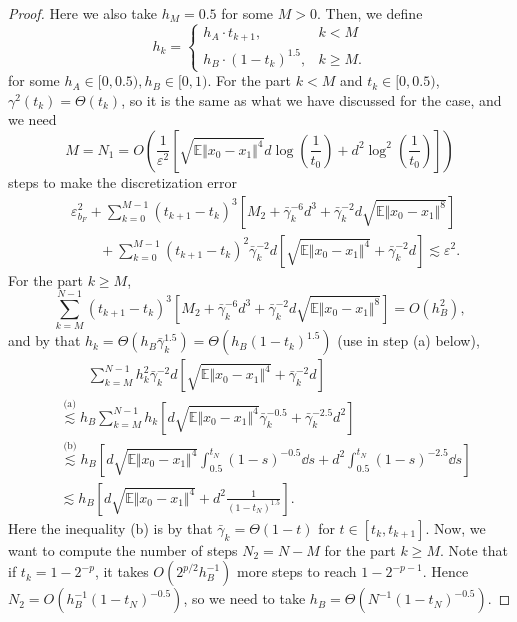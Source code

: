 \begin{proof}
    Here we also take $h_M=0.5$ for some $M>0$. Then, we define
    $$h_k=\begin{cases}
        h_A\cdot t_{k+1},&k<M\\
        h_B\cdot (1-t_k)^{1.5},&k\ge M.
    \end{cases}$$
    for some $h_A\in[0,0.5),h_B\in[0,1)$.
    For the part $k<M$ and $t_k\in[0,0.5)$, $\gamma^2(t_k)=\Theta(t_k)$, so it is the same as what we have discussed for the case, and we need $$M=N_1=O\left(\frac{1}{\varepsilon^2}\left[\sqrt{\mathbb{E}\Vert x_0-x_1\Vert^4}d\log\left(\frac{1}{t_0}\right)+d^2\log^2\left(\frac{1}{t_0}\right)\right]\right)$$
    steps to make the discretization error $$\begin{aligned}
        &\varepsilon_{b_F}^2+\sum_{k=0}^{M-1}(t_{k+1}-t_k)^3\left[M_2+\bar{\gamma}_k^{-6}d^3+\bar{\gamma}_k^{-2}d\sqrt{\mathbb{E}\Vert x_0-x_1\Vert^{8}}\right]\\
        &\qquad+\sum_{k=0}^{M-1}(t_{k+1}-t_k)^2\bar{\gamma}_k^{-2}d\left[\sqrt{\mathbb{E}\Vert x_0-x_1\Vert^4}+\bar{\gamma}_k^{-2}d\right]\lesssim\varepsilon^2.
    \end{aligned}$$
    For the part $k\ge M$, 
    $$\sum_{k=M}^{N-1}(t_{k+1}-t_k)^3\left[M_2+\bar{\gamma}_k^{-6}d^3+\bar{\gamma}_k^{-2}d\sqrt{\mathbb{E}\Vert x_0-x_1\Vert^{8}}\right]=O(h_B^2),$$
    and by that $h_k=\Theta(h_B\bar{\gamma}_k^{1.5})=\Theta(h_B(1-t_k)^{1.5})$ (use in step (a) below),
    $$\begin{aligned}
        &\qquad\sum_{k=M}^{N-1}h_k^2\bar{\gamma}_k^{-2}d\left[\sqrt{\mathbb{E}\Vert x_0-x_1\Vert^4}+\bar{\gamma}_k^{-2}d\right]\\
        &\overset{\text{(a)}}{\lesssim} h_B\sum_{k=M}^{N-1}h_k\left[d\sqrt{\mathbb{E}\Vert x_0-x_1\Vert^4}\bar{\gamma}_k^{-0.5}+\bar{\gamma}_k^{-2.5}d^2\right]\\
        &\overset{\text{(b)}}{\lesssim} h_B\left[d\sqrt{\mathbb{E}\Vert x_0-x_1\Vert^4}\int_{0.5}^{t_N}(1-s)^{-0.5}\dd s+d^2\int_{0.5}^{t_N}(1-s)^{-2.5}\dd s\right]\\
        &\lesssim h_B\left[d\sqrt{\mathbb{E}\Vert x_0-x_1\Vert^4}+d^2\frac{1}{(1-t_N)^{1.5}}\right].
    \end{aligned}$$
    Here the inequality (b) is by that $\bar{\gamma}_k=\Theta(1-t)$ for $t\in[t_k,t_{k+1}]$. Now, we want to compute the number of steps $N_2=N-M$ for the part $k\ge M$. Note that if $t_k=1-2^{-p}$, it takes $O(2^{p/2}h_B^{-1})$ more steps to reach $1-2^{-p-1}$. Hence $N_2=O\left(h_B^{-1}(1-t_N)^{-0.5}\right)$, so we need to take $h_B=\Theta\left(N^{-1}(1-t_N)^{-0.5}\right)$.

\end{proof}
